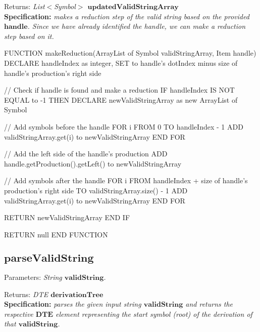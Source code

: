 Returns: \textit{List\(<\)Symbol\(>\) \(\boldsymbol{updatedValidStringArray}\)}\\

\textbf{Specification:} \textit{makes a reduction step of the valid string based on the provided \(\boldsymbol{handle}\).
Since we have already identified the handle, we can make a reduction step based on it.
}\\

\vspace{10pt}

\begin{codeblock}
    FUNCTION makeReduction(ArrayList of Symbol validStringArray, Item handle)
    DECLARE handleIndex as integer, SET to handle's dotIndex minus size of handle's production's right side

    // Check if handle is found and make a reduction
    IF handleIndex IS NOT EQUAL to -1 THEN
    DECLARE newValidStringArray as new ArrayList of Symbol

    // Add symbols before the handle
    FOR i FROM 0 TO handleIndex - 1
    ADD validStringArray.get(i) to newValidStringArray
    END FOR

    // Add the left side of the handle's production
    ADD handle.getProduction().getLeft() to newValidStringArray

    // Add symbols after the handle
    FOR i FROM handleIndex + size of handle's production's right side TO validStringArray.size() - 1
    ADD validStringArray.get(i) to newValidStringArray
    END FOR

    RETURN newValidStringArray
    END IF

    RETURN null
    END FUNCTION

\end{codeblock}

\vspace{20pt}

\subsection{\(\boldsymbol{parseValidString}\)}

Parameters: \textit{String \(\boldsymbol{validString}\).}

Returns: \textit{DTE \(\boldsymbol{derivationTree}\)}\\

\textbf{Specification:} \textit{parses the given input string \(\boldsymbol{validString}\) and returns the respective \(\boldsymbol{DTE}\) element representing the start symbol (root) of the derivation of that \(\boldsymbol{validString}\).}\\

